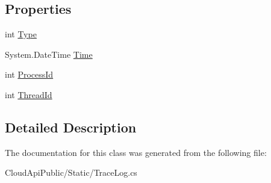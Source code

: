 \subsection*{Properties}
\begin{DoxyCompactItemize}
\item 
\hypertarget{class_cloud_api_public_1_1_static_1_1_entry_a41a262fb34a84011f4d97b9adcda7f6e}{int \hyperlink{class_cloud_api_public_1_1_static_1_1_entry_a41a262fb34a84011f4d97b9adcda7f6e}{Type}}\label{class_cloud_api_public_1_1_static_1_1_entry_a41a262fb34a84011f4d97b9adcda7f6e}

\begin{DoxyCompactList}\small\item\em \end{DoxyCompactList}\item 
\hypertarget{class_cloud_api_public_1_1_static_1_1_entry_a58e4910bf0abc52b5a108889612e2a59}{System.\-Date\-Time \hyperlink{class_cloud_api_public_1_1_static_1_1_entry_a58e4910bf0abc52b5a108889612e2a59}{Time}}\label{class_cloud_api_public_1_1_static_1_1_entry_a58e4910bf0abc52b5a108889612e2a59}

\begin{DoxyCompactList}\small\item\em \end{DoxyCompactList}\item 
\hypertarget{class_cloud_api_public_1_1_static_1_1_entry_a6351c3e3c36add53c63c0bd2a7f2e355}{int \hyperlink{class_cloud_api_public_1_1_static_1_1_entry_a6351c3e3c36add53c63c0bd2a7f2e355}{Process\-Id}}\label{class_cloud_api_public_1_1_static_1_1_entry_a6351c3e3c36add53c63c0bd2a7f2e355}

\begin{DoxyCompactList}\small\item\em \end{DoxyCompactList}\item 
\hypertarget{class_cloud_api_public_1_1_static_1_1_entry_a65feeb27818fd9f3211208dfdf6e6c84}{int \hyperlink{class_cloud_api_public_1_1_static_1_1_entry_a65feeb27818fd9f3211208dfdf6e6c84}{Thread\-Id}}\label{class_cloud_api_public_1_1_static_1_1_entry_a65feeb27818fd9f3211208dfdf6e6c84}

\begin{DoxyCompactList}\small\item\em \end{DoxyCompactList}\end{DoxyCompactItemize}


\subsection{Detailed Description}


The documentation for this class was generated from the following file\-:\begin{DoxyCompactItemize}
\item 
Cloud\-Api\-Public/\-Static/Trace\-Log.\-cs\end{DoxyCompactItemize}
